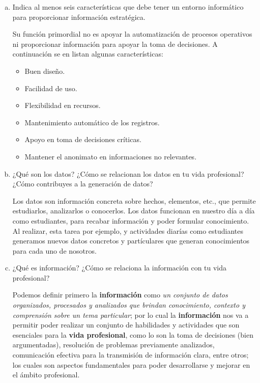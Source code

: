\documentclass[12pt]{article}
\begin{document}
\begin{enumerate}[a.]
\item Indica al menos seis características que debe tener un entorno informático para proporcionar información estratégica.\newline

Su función primordial no es apoyar la automatización de procesos operativos ni proporcionar información para apoyar la toma de decisiones. A continuación se en listan algunas características:
\begin{itemize}
\item Buen diseño.
\item Facilidad de uso.
\item Flexibilidad en recursos.
\item Mantenimiento automático de los registros.
\item Apoyo en toma de decisiones críticas.
\item Mantener el anonimato en informaciones no relevantes.
\end{itemize}

\item ¿Qué son los datos? ¿Cómo se relacionan los datos en tu vida profesional? ¿Cómo contribuyes a la
generación de datos?\newline

Los datos son información concreta sobre hechos, elementos, etc., que permite estudiarlos, analizarlos o conocerlos. Los datos funcionan en nuestro día a día como estudiantes, para recabar información y poder formular conocimiento. Al realizar, esta tarea por ejemplo, y actividades diarías como estudiantes generamos nuevos datos concretos y partículares que generan conocimientos para cada uno de nosotros.

\item ¿Qué es información? ¿Cómo se relaciona la información con tu vida profesional?

Podemos definir primero la \textbf{información} como \textit{un conjunto de datos organizados, procesados y analizados que brindan conocimiento, contexto y comprensión sobre un tema particular}; por lo cual la \textbf{información} nos va a permitir poder realizar un conjunto de habilidades y actividades que son esenciales para la \textbf{vida profesional}, como lo son la toma de decisiones (bien argumentadas), resolución de problemas previamente analizados, comunicación efectiva para la transmisión de información clara, entre otros; los cuales son aspectos fundamentales para poder desarrollarse y mejorar en el ámbito profesional.



\end{enumerate}
\end{document}
